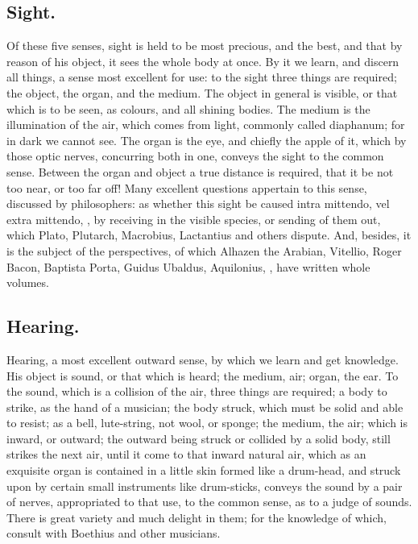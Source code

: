 {\subsection{Sight.}
Of these five senses, sight is held to be most precious, and
the best, and that by reason of his object, it sees the whole body at
once. By it we learn, and discern all things, a sense most excellent
for use: to the sight three things are required; the object, the organ,
and the medium. The object in general is visible, or that which is to
be seen, as colours, and all shining bodies. The medium is the
illumination of the air, which comes from light, commonly called
diaphanum; for in dark we cannot see. The organ is the eye, and chiefly
the apple of it, which by those optic nerves, concurring both in one,
conveys the sight to the common sense. Between the organ and object a
true distance is required, that it be not too near, or too far off!
Many excellent questions appertain to this sense, discussed by
philosophers: as whether this sight be caused intra mittendo, vel extra
mittendo, \etc{}, by receiving in the visible species, or sending of them
out, which Plato, Plutarch, Macrobius, Lactantius
and others dispute. And, besides, it is the subject of the
perspectives, of which Alhazen the Arabian, Vitellio, Roger Bacon,
Baptista Porta, Guidus Ubaldus, Aquilonius, \etc{}, have written whole
volumes.
\subsection{Hearing.}
Hearing, a most excellent outward sense, by which we learn
and get knowledge. His object is sound, or that which is heard; the
medium, air; organ, the ear. To the sound, which is a collision of the
air, three things are required; a body to strike, as the hand of a
musician; the body struck, which must be solid and able to resist; as a
bell, lute-string, not wool, or sponge; the medium, the air; which is
inward, or outward; the outward being struck or collided by a solid
body, still strikes the next air, until it come to that inward natural
air, which as an exquisite organ is contained in a little skin formed
like a drum-head, and struck upon by certain small instruments like
drum-sticks, conveys the sound by a pair of nerves, appropriated to
that use, to the common sense, as to a judge of sounds. There is great
variety and much delight in them; for the knowledge of which, consult
with Boethius and other musicians.
}
